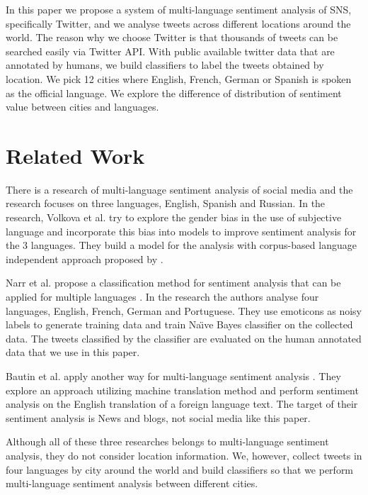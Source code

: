 \documentclass[twocolumn]{article}
\begin{document}
In this paper we propose a system of multi-language sentiment analysis of SNS, specifically Twitter, and we analyse tweets across different locations around the world.
The reason why we choose Twitter is that thousands of tweets can be searched easily via Twitter API.
With public available twitter data that are annotated by humans, we build classifiers to label the tweets obtained by location.
We pick 12 cities where English, French, German or Spanish is spoken as the official language.
We explore the difference of distribution of sentiment value between cities and languages.

\vspace{-6mm}

\section{Related Work}
\vspace{-2mm}
There is a research of multi-language sentiment analysis of social media \cite{related_work1} and the research focuses on three languages, English, Spanish and Russian.
In the research, Volkova et al. try to explore the gender bias in the use of subjective language and incorporate this bias into models to improve sentiment analysis for the 3 languages.
They build a model for the analysis with corpus-based language independent approach proposed by \cite{twitter_lexicon}.  

Narr et al. propose a classification method for sentiment analysis that can be applied for multiple languages \cite{dataset}.
In the research the authors analyse four languages, English, French, German and Portuguese.
They use emoticons as noisy labels to generate training data and train Na\"\i ve Bayes classifier on the collected data.
The tweets classified by the classifier are evaluated on the human annotated data that we use in this paper.

Bautin et al. apply another way for multi-language sentiment analysis \cite{related_work3}.
They explore an approach utilizing machine translation method and perform sentiment analysis on the English translation of a foreign language text.
The target of their sentiment analysis is News and blogs, not social media like this paper.

Although all of these three researches belongs to multi-language sentiment analysis, they do not consider location information.
We, however, collect tweets in four languages by city around the world and build classifiers so that we perform multi-language sentiment analysis between different cities.
\end{document}
